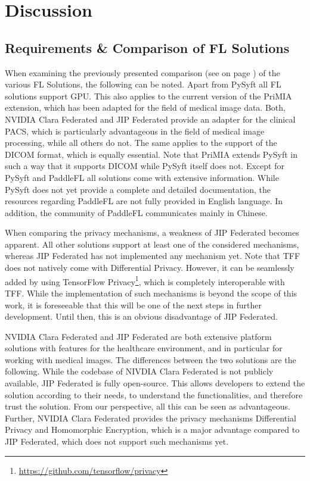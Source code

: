 \section{Discussion}
\label{sec:Discussion}

\subsection{Requirements \& Comparison of FL Solutions}
\label{subsec:DiscussionRequirements}

When examining the previously presented comparison (see  on page \pageref{subsec:ResultsRequirements}) of the various FL Solutions, the following can be noted.
Apart from PySyft all FL solutions support GPU. This also applies to the current version of the PriMIA extension, which has been adapted for the field of medical image data.
Both, NVIDIA Clara Federated and JIP Federated provide an adapter for the clinical PACS, which is particularly advantageous in the field of medical image processing, while all others do not. The same applies to the support of the DICOM format, which is equally essential.
Note that PriMIA extends PySyft in such a way that it supports DICOM while PySyft itself does not.
Except for PySyft and PaddleFL all solutions come with extensive information. While PySyft does not yet provide a complete and detailed documentation, the resources regarding PaddleFL are not fully provided in English language. In addition, the community of PaddleFL communicates mainly in Chinese.

When comparing the privacy mechanisms, a weakness of JIP Federated becomes apparent. All other solutions support at least one of the considered mechanisms, whereas JIP Federated has not implemented any mechanism yet.
Note that TFF does not natively come with Differential Privacy. However, it can be seamlessly added by using TensorFlow Privacy\footnote{\url{https://github.com/tensorflow/privacy}}, which is completely interoperable with TFF.
While the implementation of such mechanisms is beyond the scope of this work, it is foreseeable that this will be one of the next steps in further development. %
Until then, this is an obvious disadvantage of JIP Federated.

NVIDIA Clara Federated and JIP Federated are both extensive platform solutions with features for the healthcare environment, and in particular for working with medical images.
The differences between the two solutions are the following. While the codebase of NIVDIA Clara Federated is not publicly available, JIP Federated is fully open-source. This allows developers to extend the solution according to their needs, to understand the functionalities, and therefore trust the solution.
From our perspective, all this can be seen as advantageous.
Further, NVIDIA Clara Federated provides the privacy mechanisms Differential Privacy and Homomorphic Encryption, which is a major advantage compared to JIP Federated, which does not support such mechanisms yet.

